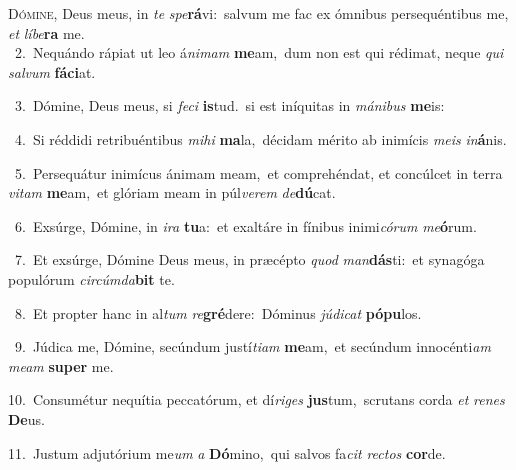 \lettrine{\initial\textcolor{\initialcolor}{D}}{ómine,} Deus meus, in \textit{te} \textit{spe}\-\textbf{rá}vi:~\star salvum me fac ex ómnibus persequéntibus me, \textit{et} \textit{lí}\-\textit{be}\textbf{ra} me.\\
{\numbfont\textcolor{\numbcolor}{~2.}}~Nequándo rápiat ut leo á\-\textit{ni}\-\textit{mam} \textbf{me}\-am,~\star dum non est qui rédimat, neque \textit{qui} \textit{sal}\-\textit{vum} \textbf{fá}\-\textbf{ci}at.\par
{\numbfont\textcolor{\numbcolor}{~3.}}~Dómine, Deus meus, si \textit{fe}\-\textit{ci} \textbf{is}\-tud.~\star si est iníquitas in \textit{má}\-\textit{ni}\textit{bus} \textbf{me}\-is:\par
{\numbfont\textcolor{\numbcolor}{~4.}}~Si réddidi retribuéntibus \textit{mi}\-\textit{hi} \textbf{ma}\-la,~\star décidam mérito ab inimícis \textit{me}\-\textit{is} \textit{in}\-\textbf{á}nis.\par
{\numbfont\textcolor{\numbcolor}{~5.}}~Persequátur inimícus ánimam meam,~\dagger et comprehéndat, et concúlcet in terra \textit{vi}\-\textit{tam} \textbf{me}\-am,~\star et glóriam meam in púl\-\textit{ve}\-\textit{rem} \textit{de}\-\textbf{dú}cat.\par
{\numbfont\textcolor{\numbcolor}{~6.}}~Exsúrge, Dómine, in \textit{i}\-\textit{ra} \textbf{tu}\-a:~\star et exaltáre in fínibus inimi\-\textit{có}\-\textit{rum} \textit{me}\-\textbf{ó}rum.\par
{\numbfont\textcolor{\numbcolor}{~7.}}~Et exsúrge, Dómine Deus meus, in præcépto \textit{quod} \textit{man}\-\textbf{dás}ti:~\star et synagóga populórum \textit{cir}\-\textit{cúm}\textit{da}\textbf{bit} te.\par
{\numbfont\textcolor{\numbcolor}{~8.}}~Et propter hanc in al\textit{tum} \textit{re}\-\textbf{gré}dere:~\star Dóminus \textit{jú}\-\textit{di}\textit{cat} \textbf{pó}\-\textbf{pu}los.\par
{\numbfont\textcolor{\numbcolor}{~9.}}~Júdica me, Dómine, secúndum justí\-\textit{ti}\-\textit{am} \textbf{me}\-am,~\star et secúndum innocénti\textit{am} \textit{me}\-\textit{am} \textbf{su}\-\textbf{per} me.\par
{\numbfont\textcolor{\numbcolor}{10.}}~Consumétur nequítia peccatórum, et dí\-\textit{ri}\-\textit{ges} \textbf{jus}\-tum,~\star scrutans corda \textit{et} \textit{re}\-\textit{nes} \textbf{De}\-us.\par
{\numbfont\textcolor{\numbcolor}{11.}}~Justum adjutórium me\textit{um} \textit{a} \textbf{Dó}\-mino,~\star qui salvos fa\textit{cit} \textit{rec}\-\textit{tos} \textbf{cor}\-de.\par

